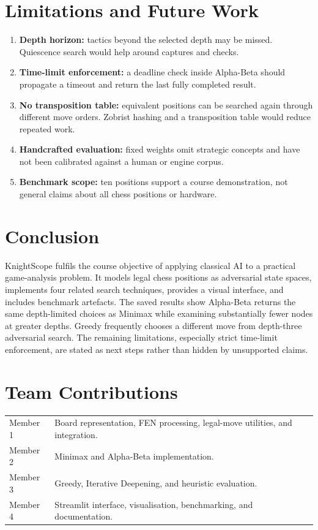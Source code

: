 \documentclass[12pt,a4paper]{report}
\begin{document}
\chapter{Limitations and Future Work}\label{ch:limits}
\begin{enumerate}
\item \textbf{Depth horizon:} tactics beyond the selected depth may be missed. Quiescence search would help around captures and checks.
\item \textbf{Time-limit enforcement:} a deadline check inside Alpha-Beta should propagate a timeout and return the last fully completed result.
\item \textbf{No transposition table:} equivalent positions can be searched again through different move orders. Zobrist hashing and a transposition table would reduce repeated work.
\item \textbf{Handcrafted evaluation:} fixed weights omit strategic concepts and have not been calibrated against a human or engine corpus.
\item \textbf{Benchmark scope:} ten positions support a course demonstration, not general claims about all chess positions or hardware.
\end{enumerate}

\chapter{Conclusion}
KnightScope fulfils the course objective of applying classical AI to a practical game-analysis problem. It models legal chess positions as adversarial state spaces, implements four related search techniques, provides a visual interface, and includes benchmark artefacts. The saved results show Alpha-Beta returns the same depth-limited choices as Minimax while examining substantially fewer nodes at greater depths. Greedy frequently chooses a different move from depth-three adversarial search. The remaining limitations, especially strict time-limit enforcement, are stated as next steps rather than hidden by unsupported claims.

\chapter*{Team Contributions}
\begin{tabular}{p{}p{}}\toprule
Member 1 & Board representation, FEN processing, legal-move utilities, and integration.\\
Member 2 & Minimax and Alpha-Beta implementation.\\
Member 3 & Greedy, Iterative Deepening, and heuristic evaluation.\\
Member 4 & Streamlit interface, visualisation, benchmarking, and documentation.\\\bottomrule
\end{tabular}
\end{document}
